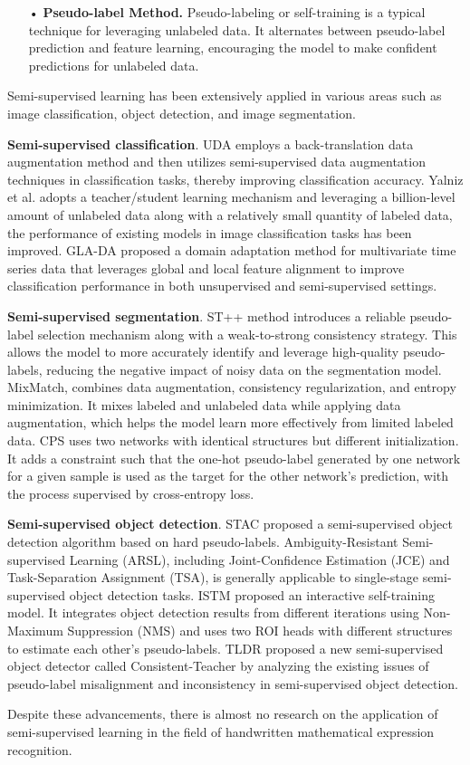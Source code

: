 \begin{itemize}
    \item [•]
    \textbf{Pseudo-label Method.}
    Pseudo-labeling or self-training is a typical technique for leveraging unlabeled data. It alternates between pseudo-label prediction and feature learning, encouraging the model to make confident predictions for unlabeled data. 
\end{itemize}

Semi-supervised learning has been extensively applied in various areas such as image classification, object detection, and image segmentation.

\textbf{Semi-supervised classification}. 
UDA\cite{xie2020unsupervised} employs a back-translation data augmentation method and then utilizes semi-supervised data augmentation techniques in classification tasks, thereby improving classification accuracy. Yalniz et al.\cite{yalniz2019billion} adopts a teacher/student learning mechanism and leveraging a billion-level amount of unlabeled data along with a relatively small quantity of labeled data, the performance of existing models in image classification tasks has been improved. GLA-DA\cite{tu2024gla} proposed a domain adaptation method for multivariate time series data that leverages global and local feature alignment to improve classification performance in both unsupervised and semi-supervised settings. 

\textbf{Semi-supervised segmentation}.
ST++\cite{yang2022st++} method introduces a reliable pseudo-label selection mechanism along with a weak-to-strong consistency strategy. This allows the model to more accurately identify and leverage high-quality pseudo-labels, reducing the negative impact of noisy data on the segmentation model. MixMatch\cite{berthelot2019mixmatch}, combines data augmentation, consistency regularization, and entropy minimization. It mixes labeled and unlabeled data while applying data augmentation, which helps the model learn more effectively from limited labeled data.  CPS\cite{chen2021semi} uses two networks with identical structures but different initialization. It adds a constraint such that the one-hot pseudo-label generated by one network for a given sample is used as the target for the other network's prediction, with the process supervised by cross-entropy loss. 

\textbf{Semi-supervised object detection}.
STAC\cite{sohn2020simple} proposed a semi-supervised object detection algorithm based on hard pseudo-labels. Ambiguity-Resistant Semi-supervised Learning (ARSL)\cite{liu2023ambiguity}, including Joint-Confidence Estimation (JCE) and Task-Separation Assignment (TSA), is generally applicable to single-stage semi-supervised object detection tasks. ISTM\cite{yang2021interactive} proposed an interactive self-training model. It integrates object detection results from different iterations using Non-Maximum Suppression (NMS) and uses two ROI heads with different structures to estimate each other's pseudo-labels.  TLDR\cite{wang2022consistent} proposed a new semi-supervised object detector called Consistent-Teacher by analyzing the existing issues of pseudo-label misalignment and inconsistency in semi-supervised object detection. 

Despite these advancements, there is almost no research on the application of semi-supervised learning in the field of handwritten mathematical expression recognition.